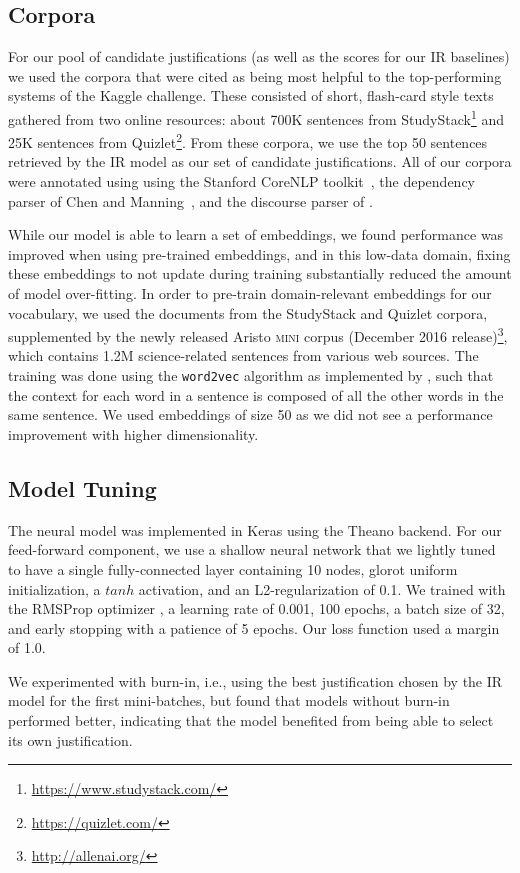 \subsection{Corpora}
For our pool of candidate justifications (as well as the scores for our IR baselines) we used the corpora that were cited as being most helpful to the top-performing systems of the Kaggle challenge.  These consisted of short, flash-card style texts gathered from two online resources:  about 700K sentences from StudyStack\footnote{{\scriptsize \url{https://www.studystack.com/}}} and 25K sentences from Quizlet\footnote{{\scriptsize \url{https://quizlet.com/}}}.
From these corpora, we use the top 50 sentences retrieved by the IR model as our set of candidate justifications.  All of our corpora were annotated using using the Stanford CoreNLP toolkit~\cite{manning2014stanford}, the dependency parser of Chen and Manning~\citeyear{chen2014fast}, and the discourse parser of \citet{Surdeanu:15}.

While our model is able to learn a set of embeddings, we found performance was improved when using pre-trained embeddings, and in this low-data domain, fixing these embeddings to not update during training substantially reduced the amount of model over-fitting.   In order to pre-train domain-relevant embeddings for our vocabulary, we used the documents from the StudyStack and Quizlet corpora, supplemented by the newly released Aristo \textsc{mini} corpus (December 2016 release)\footnote{{\scriptsize \url{http://allenai.org/}}}, which contains 1.2M science-related sentences from various web sources.  The training was done using the \texttt{word2vec} algorithm \cite{mikolov10, mikolov13} as implemented by \citet{levy2014dependency}, such that the context for each word in a sentence is composed of all the other words in the same sentence.  We used embeddings of size 50 as we did not see a performance improvement with higher dimensionality.

\subsection{Model Tuning}
The neural model was implemented in Keras \cite{chollet2015keras} using the Theano \cite{2016arXiv160502688short} backend.  For our feed-forward component, we use a shallow neural network that we lightly tuned to have a single fully-connected layer containing 10 nodes, glorot uniform initialization, a $tanh$ activation, and an L2-regularization of 0.1.  We trained with the RMSProp optimizer \citep{rmsprop},  a learning rate of 0.001, 100 epochs, a batch size of 32, and early stopping with a patience of 5 epochs.  Our loss function used a margin of 1.0.  

We experimented with burn-in, i.e., using the best justification chosen by the IR model for the first mini-batches, but found that models without burn-in performed better, indicating that the model benefited from being able to select its own justification.
 
